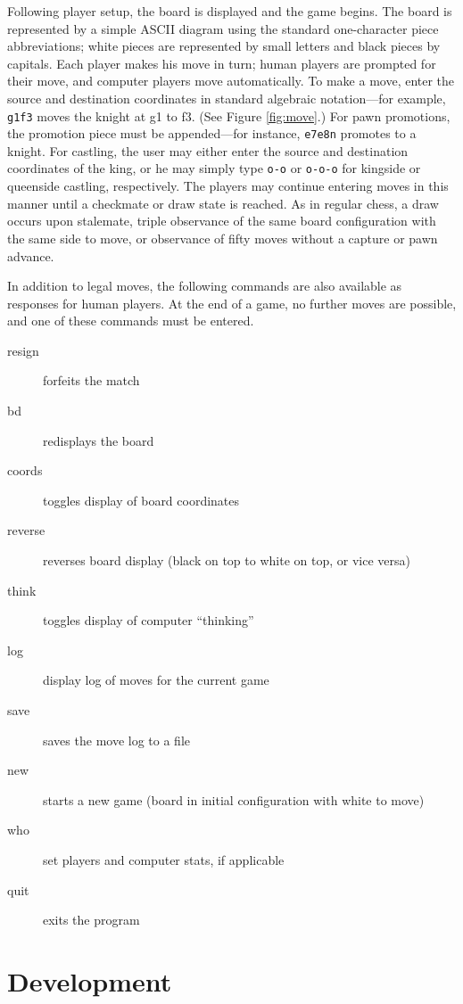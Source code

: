 \documentclass[12pt]{article}
\begin{document}
Following player setup, the board is displayed and the game begins.
The board is represented by a simple ASCII diagram using the standard
one-character piece abbreviations; white pieces are represented by
small letters and black pieces by capitals.  Each player makes his
move in turn; human players are prompted for their move, and computer
players move automatically. To make a move, enter the source and
destination coordinates in standard algebraic notation---for example,
\texttt{g1f3} moves the knight at g1 to f3.  (See Figure
\ref{fig:move}.) For pawn promotions, the promotion piece must be
appended---for instance, \texttt{e7e8n} promotes to a knight. For
castling, the user may either enter the source and destination
coordinates of the king, or he may simply type \texttt{o-o} or
\texttt{o-o-o} for kingside or queenside castling, respectively. The
players may continue entering moves in this manner until a checkmate
or draw state is reached. As in regular chess, a draw occurs upon
stalemate, triple observance of the same board configuration with the
same side to move, or observance of fifty moves without a capture or
pawn advance.

In addition to legal moves, the following commands are also available
as responses for human players. At the end of a game, no further moves
are possible, and one of these commands must be entered.

\begin{description}
\item[resign] forfeits the match
\item[bd] redisplays the board
\item[coords] toggles display of board coordinates
\item[reverse] reverses board display (black on top to white on top, or vice versa)
\item[think] toggles display of computer ``thinking''
\item[log] display log of moves for the current game
\item[save] saves the move log to a file
\item[new] starts a new game (board in initial configuration with white to move)
\item[who] set players and computer stats, if applicable
\item[quit] exits the program
\end{description}

\section{Development}
\end{document}
